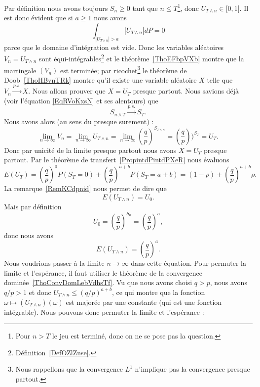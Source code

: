 Par définition nous avons toujours \( S_n\geq 0\) tant que \( n\leq T\)\footnote{Pour \( n>T\) le jeu est terminé, donc on ne se pose pas la question.}, donc \( U_{T\wedge n}\in\mathopen[ 0 , 1 \mathclose]\). Il est donc évident que si \( a\geq 1\) nous avons
\begin{equation}
    \int_{| U_{T\wedge n} |>a}| U_{T\wedge n} |dP=0
\end{equation}
parce que le domaine d'intégration est vide. Donc les variables aléatoires \( V_n=U_{T\wedge n}\) sont équi-intégrables\footnote{Définition~\ref{DefOZlZnse}.} et le théorème~\ref{ThoEFbpVXb} montre que la martingale \( (V_n)\) est terminée; par ricochet\footnote{Nous rappellons que la convergence \( L^1\) n'implique pas la convergence presque partout.} le théorème de Doob~\ref{ThoHBvnTRk} montre qu'il existe une variable aléatoire \( X\) telle que $V_n\stackrel{p.s.}{\longrightarrow}X$. Nous allons prouver que \( X=U_T\) presque partout. Nous savions déjà (voir l'équation \eqref{EqRVoKxsN} et ses alentours) que
\begin{equation}
    S_{n\wedge T}\stackrel{p.s.}{\longrightarrow}S_T.
\end{equation}
Nous avons alors (au sens du presque surement) :
\begin{equation}
    \lim_{n\to \infty} V_n=\lim_{n\to \infty} U_{T\wedge n}=\lim_{n\to \infty} \left( \frac{ q }{ p } \right)^{S_{T\wedge n}}=\left( \frac{ q }{ p } \right))^{S_T}=U_T.
\end{equation}
Donc par unicité de la limite presque partout nous avons \( X=U_T\) presque partout. Par le théorème de transfert~\ref{PropintdPintdPXeR} nous évaluons
\begin{equation}    \label{EqYFycUag}
    E(U_T)=\left( \frac{ q }{ p } \right)^0P(S_T=0)+\left( \frac{ q }{ p } \right)^{a+b}P(S_T=a+b)=(1-\rho)+\left( \frac{ q }{ p } \right)^{a+b}\rho.
\end{equation}
La remarque~\ref{RemKCdpnid} nous permet de dire que
\begin{equation}
    E(U_{T\wedge n})=U_0.
\end{equation}
Mais par définition
\begin{equation}
    U_0=\left( \frac{ q }{ p } \right)^{S_0}=\left( \frac{ q }{ p } \right)^a,
\end{equation}
donc nous avons
\begin{equation}
    E(U_{T\wedge n})=\left( \frac{ q }{ p } \right)^a.
\end{equation}
Nous voudrions passer à la limite \( n\to \infty\) dans cette équation. Pour permuter la limite et l'espérance, il faut utiliser le théorème de la convergence dominée~\ref{ThoConvDomLebVdhsTf}. Vu que nous avons choisi \( q>p\), nous avons \( q/p>1\) et donc \( U_{T\wedge n}\leq (q/p)^{a+b}\), ce qui montre que la fonction \( \omega\mapsto (U_{T\wedge n})(\omega)\) est majorée par une constante (qui est une fonction intégrable). Nous pouvons donc permuter la limite et l'espérance :

